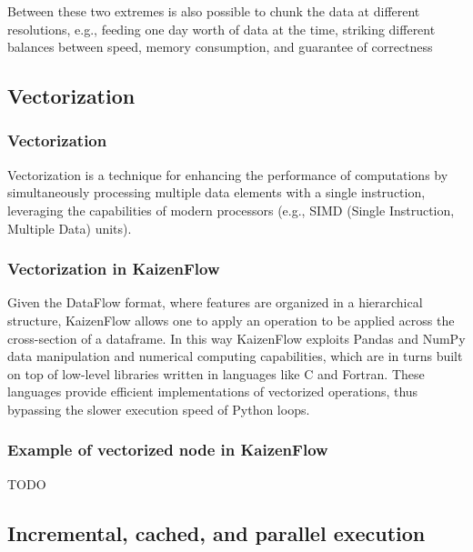 \documentclass[11pt, reqno]{amsart}
\theoremstyle{definition}
\theoremstyle{remark}
\begin{document}
Between these two extremes is also possible to chunk the data at
different resolutions, e.g., feeding one day worth of data at the time,
striking different balances between speed, memory consumption, and
guarantee of correctness

\subsection{Vectorization}

\subsubsection{Vectorization}
Vectorization is a technique for enhancing the performance of computations by
simultaneously processing multiple data elements with a single instruction,
leveraging the capabilities of modern processors (e.g., SIMD (Single
Instruction, Multiple Data) units).

\subsubsection{Vectorization in KaizenFlow}
Given the DataFlow format, where features are organized in a hierarchical
structure, KaizenFlow allows one to apply an operation to be applied across the
cross-section of a dataframe.
In this way KaizenFlow exploits Pandas and NumPy data manipulation and
numerical computing capabilities, which are in turns built on top of low-level
libraries written in languages like C and Fortran. These languages provide
efficient implementations of vectorized operations, thus bypassing the slower
execution speed of Python loops.

\subsubsection{Example of vectorized node in KaizenFlow}

TODO

\subsection{Incremental, cached, and parallel execution}
\end{document}
